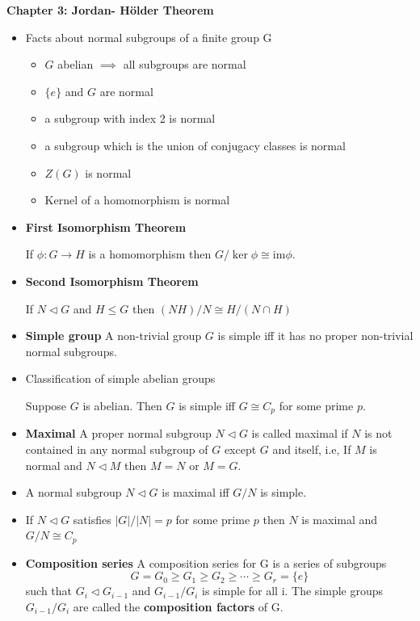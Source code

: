 \documentclass[a4paper, 12pt]
{article}
\newcommand{\im}{\text{im}}
\begin{document}
\textbf{Chapter 3: Jordan- Hölder Theorem}
\begin{itemize}
	\item Facts about normal subgroups of a finite group G
	\begin{itemize}
		\item $G$ abelian $\implies$ all subgroups are normal
		\item $\{e\}$ and $G$ are normal
		\item a subgroup with index 2 is normal
		\item a subgroup which is the union of conjugacy classes is normal
		\item $Z(G)$ is normal
		\item Kernel of a homomorphism is normal
	\end{itemize}
	
	\item \textbf{First Isomorphism Theorem}
	
	If $\phi: G \rightarrow  H$ is  a homomorphism then $G/ \ker \phi \cong \im \phi.$
	
	\item \textbf{Second Isomorphism Theorem}
	
	If $N \triangleleft G$ and $H \leq G$ then $(NH)/ N \cong H/ (N \cap H)$
	
		\item \textbf{Simple group} A non-trivial group $G$ is simple iff it has no proper non-trivial normal subgroups. 
	
	\item Classification of simple abelian groups
	
	Suppose $G$ is abelian. Then $G$ is simple iff $G \cong C_p$ for some prime $p.$
	
	\item \textbf{Maximal} A proper normal subgroup $N \triangleleft G$ is called maximal if $N$ is not contained in any normal subgroup of $G$ except $G$ and itself, i.e, If $M$ is normal and $N \triangleleft M$ then $M= N$ or $M=G.$
	
	\item A normal subgroup $N \triangleleft G$ is maximal iff $G/N$ is simple.
	
	\item If $N \triangleleft G$ satisfies $|G|/|N| = p$ for some prime $p$ then $N$ is maximal and $G/N \cong C_p$
	
	\item \textbf{Composition series} A composition series for G is a series of subgroups
	$$G= G_0 \geq G_1 \geq G_2 \geq \cdots \geq G_r = \{e\}$$ such that $G_i \triangleleft G_{i-1}$ and $G_{i-1}/G_i$ is simple for all i.  The simple groups $G_{i-1}/G_i$ are called the \textbf{composition factors} of G.
	

\end{itemize}
\end{document}
